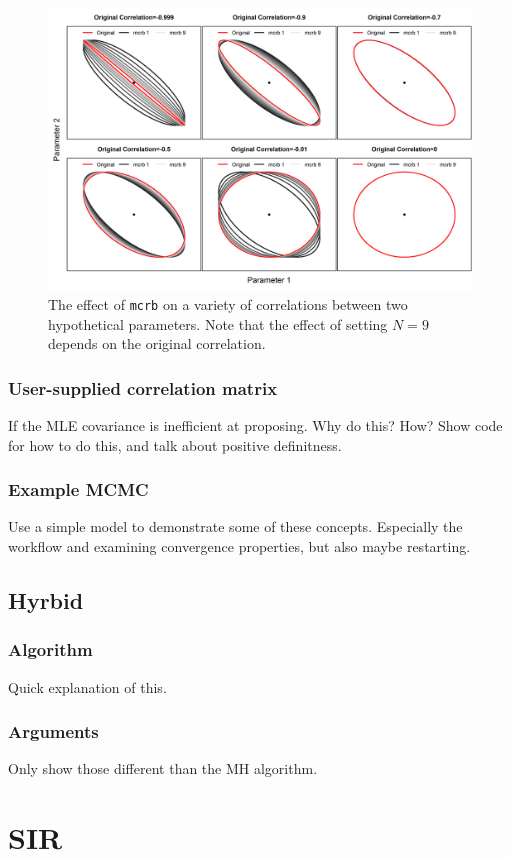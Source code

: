 \documentclass{article}
\begin{document}
\begin{figure}[h]
  \centering
  \includegraphics[width=5in]{plots/mcrb_examples.png}
  \caption{The effect of \texttt{mcrb} on a variety of
    correlations between two hypothetical parameters. Note
    that the effect of setting $N=9$ depends on the original
    correlation.}
  \label{fig:mcrb}
\end{figure}
\subsubsection{User-supplied correlation matrix}
If the MLE covariance is inefficient at proposing. Why do this?
How? Show code for how to do this, and talk about positive
definitness.
\subsubsection{Example MCMC}
Use a simple model to demonstrate some of these
concepts. Especially the workflow and examining convergence
properties, but also maybe restarting.
\subsection{Hyrbid}\label{sec:hybrid}
\subsubsection{Algorithm}
Quick explanation of this.
\subsubsection{Arguments}
Only show those different than the MH algorithm.
\section{SIR}\label{sec:sir}
\end{document}
